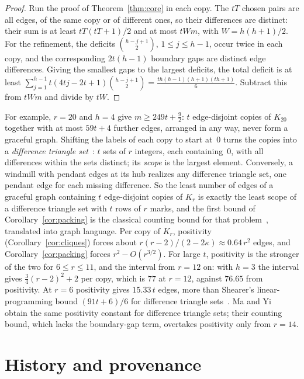 \documentclass[11pt]{amsart}
\theoremstyle{tplain}
\theoremstyle{tdefinition}
\theoremstyle{tremark}
\begin{document}
\begin{proof}
Run the proof of Theorem~\ref{thm:core} in each copy. The $tT$ chosen pairs are
all edges, of the same copy or of different ones, so their differences are
distinct: their sum is at least $tT(tT+1)/2$ and at most $tWm$, with
$W=h(h+1)/2$. For the refinement, the deficits $\binom{h-j+1}2$,
$1\le j\le h-1$, occur twice in each copy, and the corresponding $2t(h-1)$
boundary gaps are distinct edge differences. Giving the smallest gaps to the
largest deficits, the total deficit is at least
$\sum_{j=1}^{h-1}t(4tj-2t+1)\binom{h-j+1}2=\frac{th(h-1)(h+1)(th+1)}6$.
Subtract this from $tWm$ and divide by $tW$.
\end{proof}

For example, $r=20$ and $h=4$ give $m\ge249t+\frac92$: $t$ edge-disjoint
copies of $K_{20}$ together with at most $59t+4$ further edges, arranged in
any way, never form a graceful graph. Shifting the labels of each copy to start at~$0$ turns the copies
into a \emph{difference triangle set}~\cite{cc}: $t$ sets of $r$ integers, each
containing~$0$, with all differences within the sets distinct; its
\emph{scope} is the largest element. Conversely, a windmill with pendant edges
at its hub realizes any difference triangle set, one pendant edge for each
missing difference. So the least number of edges of a graceful graph
containing $t$ edge-disjoint copies of $K_r$ is exactly the least scope of a
difference triangle set with $t$ rows of $r$ marks, and the first bound of
Corollary~\ref{cor:packing} is the classical counting bound for that
problem~\cite{cc},
translated into graph language. Per copy of $K_r$, positivity
(Corollary~\ref{cor:cliques}) forces about $r(r-2)/(2-2\kappa)\approx0.64\,r^2$
edges, and Corollary~\ref{cor:packing} forces $r^2-O(r^{3/2})$. For large
$t$, positivity is the stronger of the two for $6\le r\le11$, and the interval
from $r=12$ on: with $h=3$ the interval gives $\frac34(r-2)^2+2$ per copy,
which is $77$ at $r=12$, against $76.65$ from positivity. At $r=6$
positivity gives $15.33\,t$ edges, more than Shearer's linear-programming
bound $(91t+6)/6$ for difference triangle sets~\cite{shearer}. Ma and Yi~\cite{mayi} obtain the same positivity constant for difference
triangle sets; their counting bound, which lacks the boundary-gap term,
overtakes positivity only from $r=14$.

\section{History and provenance}\label{sec:provenance}
\end{document}
